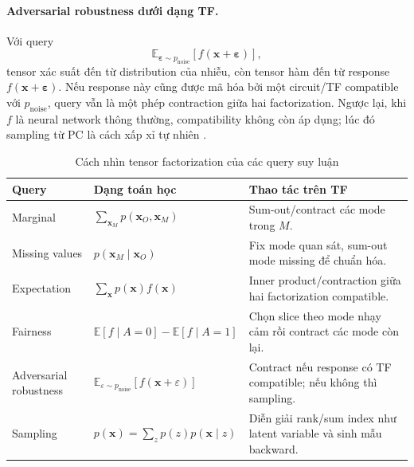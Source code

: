 \paragraph{Adversarial robustness dưới dạng TF.}
Với query
\begin{equation}
    \mathbb{E}_{\boldsymbol{\varepsilon}\sim p_{\mathrm{noise}}}
    [f(\mathbf{x}+\boldsymbol{\varepsilon})],
\end{equation}
tensor xác suất đến từ distribution của nhiễu, còn tensor hàm đến từ response
$f(\mathbf{x}+\boldsymbol{\varepsilon})$.  Nếu response này cũng được mã hóa bởi một
circuit/TF compatible với $p_{\mathrm{noise}}$, query vẫn là một phép contraction giữa
hai factorization.  Ngược lại, khi $f$ là neural network thông thường, compatibility
không còn áp dụng; lúc đó sampling từ PC là cách xấp xỉ tự nhiên
\cite{chrysos2025foundationsTutorial}.

\begin{table}[h]
\centering
\caption{Cách nhìn tensor factorization của các query suy luận}
\label{tab:tf-view-of-queries}
\begin{tabular}{L{0.22\textwidth}L{0.34\textwidth}L{0.34\textwidth}}
\toprule
\textbf{Query} & \textbf{Dạng toán học} & \textbf{Thao tác trên TF} \\
\midrule
Marginal &
$\sum_{\mathbf{x}_M}p(\mathbf{x}_O,\mathbf{x}_M)$ &
Sum-out/contract các mode trong $M$. \\
Missing values &
$p(\mathbf{x}_M\mid\mathbf{x}_O)$ &
Fix mode quan sát, sum-out mode missing để chuẩn hóa. \\
Expectation &
$\sum_{\mathbf{x}}p(\mathbf{x})f(\mathbf{x})$ &
Inner product/contraction giữa hai factorization compatible. \\
Fairness &
$\mathbb{E}[f\mid A=0]-\mathbb{E}[f\mid A=1]$ &
Chọn slice theo mode nhạy cảm rồi contract các mode còn lại. \\
Adversarial robustness &
$\mathbb{E}_{\varepsilon\sim p_{\mathrm{noise}}}[f(\mathbf{x}+\varepsilon)]$ &
Contract nếu response có TF compatible; nếu không thì sampling. \\
Sampling &
$p(\mathbf{x})=\sum_z p(z)p(\mathbf{x}\mid z)$ &
Diễn giải rank/sum index như latent variable và sinh mẫu backward. \\
\bottomrule
\end{tabular}
\end{table}

